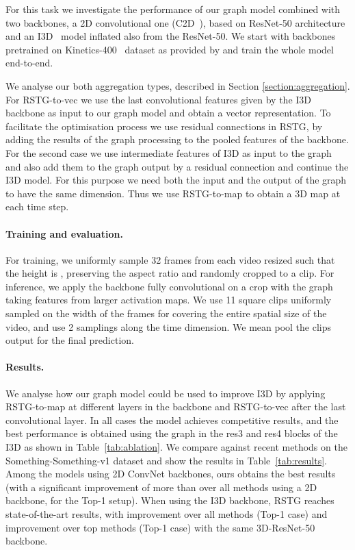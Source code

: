 \documentclass{article}
\begin{document}
For this task we investigate the performance of our graph model combined with two backbones, a 2D convolutional one (C2D~\cite{wang2018non_local}), based on ResNet-50 architecture and an I3D~\cite{carreira2017quo} model inflated also from the ResNet-50. We start with backbones pretrained on Kinetics-400~\cite{carreira2017quo} dataset as provided by \cite{wang2018non_local} and train the whole model end-to-end.

We analyse our both aggregation types, described in Section \ref{section:aggregation}. For RSTG-to-vec we use the last convolutional features given by the I3D backbone as input to our graph model and obtain a vector representation. To facilitate the optimisation process we use residual connections in RSTG, by adding the results of the graph processing to the pooled features of the backbone. For the second case we use intermediate features of I3D as input to the graph and also add them to the graph output by a residual connection and continue the I3D model. For this purpose we need both the input and the output of the graph to have the same dimension. Thus we use RSTG-to-map to obtain a 3D map at each time step. 


\paragraph{Training and evaluation.} For training, we uniformly sample 32 frames from each video resized such that the height is , preserving the aspect ratio and randomly cropped to a  clip. For inference, we apply the backbone fully convolutional on a  crop with the graph taking features from larger activation maps. We use 11 square clips uniformly sampled on the width of the frames for covering the entire spatial size of the video, and use 2 samplings along the time dimension. We mean pool the clips output for the final prediction.

\newpage
\paragraph{Results.}
We analyse how our graph model could be used to improve  I3D by applying RSTG-to-map at different layers in the backbone and RSTG-to-vec after the last convolutional layer. In all cases  the model achieves competitive results, and the best performance is obtained using the graph in the res3 and res4 blocks of the I3D as shown in Table~\ref{tab:ablation}.
We compare against recent methods on the Something-Something-v1 dataset and show the results in Table~\ref{tab:results}. Among the models using 2D ConvNet backbones, ours obtains the best results (with a significant improvement of more than  over all methods using a 2D backbone, for the Top-1 setup). When using the I3D backbone, RSTG reaches state-of-the-art results, with  improvement over all methods (Top-1 case) and  improvement over top methods (Top-1 case) with the same 3D-ResNet-50 backbone.
\end{document}
